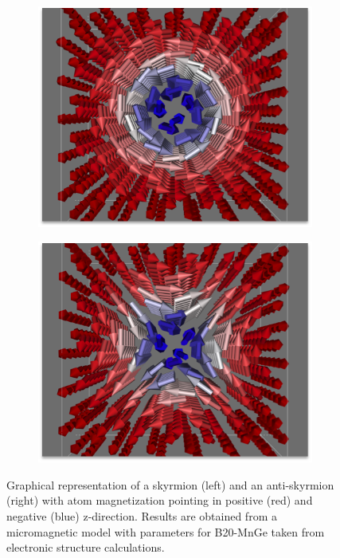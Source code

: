 \documentclass [a4paper, 12pt]{article}
\begin{document}
\begin{figure}[h]
	\centering
	\begin{subfigure}{.5\textwidth}
		  \centering
		  \includegraphics[width=.99\linewidth]{Figures/MnGe_skyrmion.png}
		  \label{fig:sub1}
	\end{subfigure}%
	\begin{subfigure}{.5\textwidth}
		  \centering
		  \includegraphics[width=.99\linewidth]{Figures/MnGe_antiskyrmion.png}
                  \label{fig:sub2}
	\end{subfigure}
	\caption{Graphical representation of a skyrmion (left) and an anti-skyrmion (right) 
	with atom magnetization pointing in positive (red) and negative (blue) z-direction. Results
	are obtained from a micromagnetic model with parameters for B20-MnGe
	taken from electronic structure calculations.}
	\label{fig:sd_results}
\end{figure}
\end{document}
